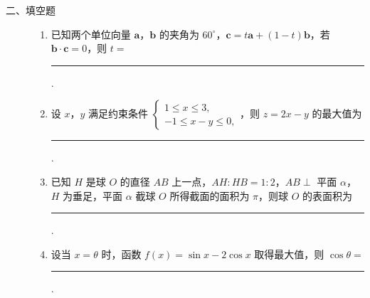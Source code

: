 \begin{description}

    \item[二、填空题]

    \begin{enumerate}[leftmargin=5pt]

      \addtocounter{enumi}{+12}

        \item 已知两个单位向量 \(\bm{a}\)，\(\bm{b}\) 的夹角为 \(60^{\circ}\)，\(\bm{c} = t\bm{a} + (1 - t)\bm{b}\)，若 \(\bm{b} \cdot \bm{c} = 0\)，则 \(t =\)\rule[-0.3ex]{3em}{0.4pt}.

        \item 设 \(x\)，\(y\) 满足约束条件 \(\begin{cases}
1 \leqslant x \leqslant 3,\\
-1 \leqslant x - y \leqslant 0,
\end{cases}\)，则 \(z = 2x - y\) 的最大值为\rule[-0.3ex]{3em}{0.4pt}.

        \item 已知 \(H\) 是球 \(O\) 的直径 \(AB\) 上一点，\(AH:HB = 1:2\)，\(AB \perp\) 平面 \(\alpha\)，\(H\) 为垂足，平面 \(\alpha\) 截球 \(O\) 所得截面的面积为 \(\pi\)，则球 \(O\) 的表面积为\rule[-0.3ex]{3em}{0.4pt}.

        \item 设当 \(x = \theta\) 时，函数 \(f(x) = \sin x - 2\cos x\) 取得最大值，则 \(\cos \theta =\)\rule[-0.3ex]{3em}{0.4pt}.

    \end{enumerate}

\end{description}

